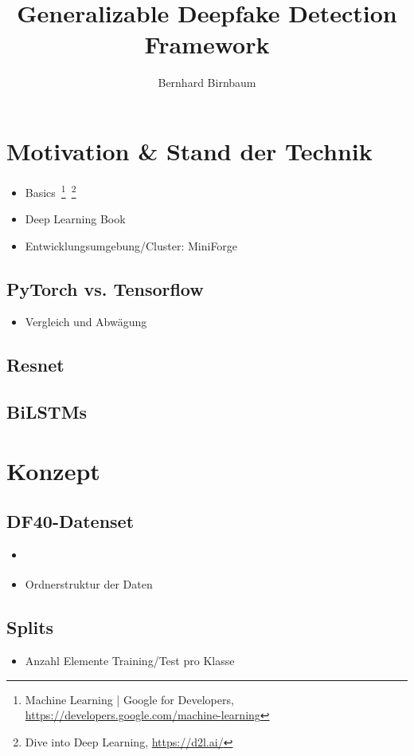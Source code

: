 \documentclass{article}
\title{Generalizable Deepfake Detection Framework}
\author{Bernhard Birnbaum}
\begin{document}
    \maketitle

    \section{Motivation \& Stand der Technik}
    \begin{itemize}
        \item Basics~\footnote{Machine Learning | Google for Developers, \url{https://developers.google.com/machine-learning}}~\footnote{Dive into Deep Learning, \url{https://d2l.ai/}}
        \item Deep Learning Book~\cite{deeplearningbook}
    \end{itemize}
    \begin{itemize}
        \item Entwicklungsumgebung/Cluster: MiniForge
    \end{itemize}
    \subsection{PyTorch vs. Tensorflow}
    \begin{itemize}
        \item Vergleich und Abwägung
    \end{itemize}
    \subsection{Resnet}
    \subsection{BiLSTMs}

    \section{Konzept}
    \subsection{DF40-Datenset}
    \begin{itemize}
        \item \cite{yan2024df40}
        \item Ordnerstruktur der Daten
    \end{itemize}
    \subsection{Splits}
    \begin{itemize}
        \item Anzahl Elemente Training/Test pro Klasse
    \end{itemize}
\end{document}
